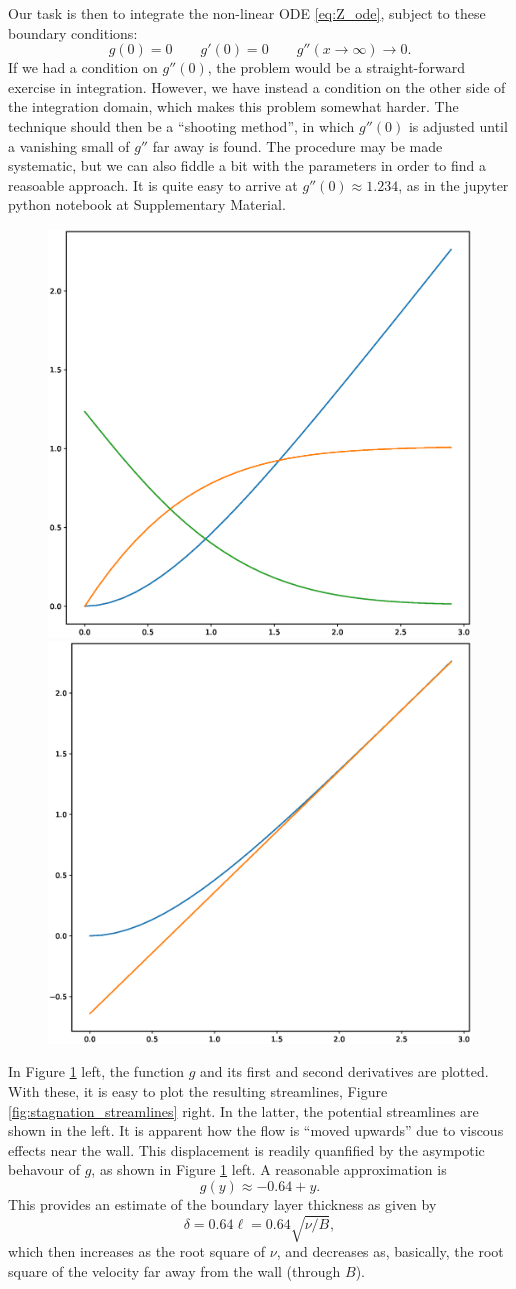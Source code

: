 Our task is then to integrate the non-linear ODE \ref{eq:Z_ode}, subject
to these boundary conditions:
\[
g(0)=0 \qquad g'(0)=0 \qquad g''(x\to \infty) \to 0 .
\]
If we had a condition on $g''(0)$, the problem would be a
straight-forward exercise in integration. However, we have instead a
condition on the other side of the integration domain, which makes
this problem somewhat harder. The technique should then be a
``shooting method'', in which $g''(0)$ is adjusted until a vanishing
small of $g''$ far away is found. The procedure may be made
systematic, but we can also fiddle a bit with the parameters in order
to find a reasoable approach. It is quite easy to arrive at
$g''(0)\approx 1.234$, as in the jupyter python notebook at
Supplementary Material.



\begin{figure}
  \centering
  \includegraphics[width=0.4\linewidth]{figures/stagnation_functions}
    \includegraphics[width=0.4\linewidth]{figures/stagnation_function_disp}
  \caption{\label{fig:stagnation_functions}}
\end{figure}


In Figure \ref{fig:stagnation_functions} left, the function $g$ and
its first and second derivatives are plotted. With these, it is easy
to plot the resulting streamlines, Figure
\ref{fig:stagnation_streamlines} right. In the latter, the potential
streamlines are shown in the left. It is apparent how the flow is
``moved upwards'' due to viscous effects near the wall. This
displacement is readily quanfified by the asympotic behavour of $g$,
as shown in Figure \ref{fig:stagnation_functions} left. A reasonable
approximation is
\[
g(y) \approx -0.64 + y .
\]
This provides an estimate of the boundary layer thickness as given
by
\[
\delta = 0.64 \ell =  0.64 \sqrt{\nu/B} ,
\]
which then increases as the root square of $\nu$, and decreases as,
basically, the root square of the velocity far away from the wall
(through $B$).

